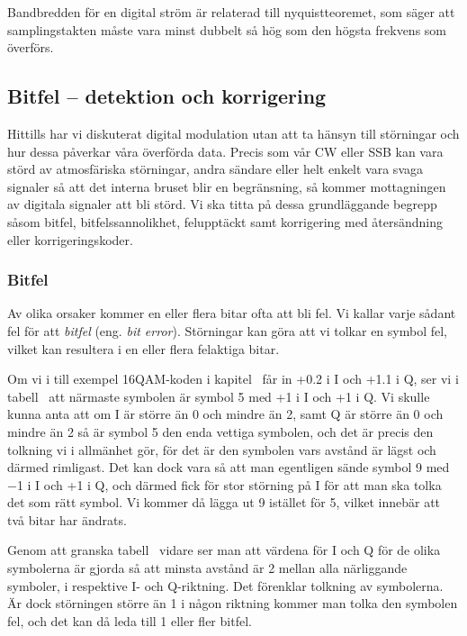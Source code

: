 Bandbredden för en digital ström är relaterad till nyquistteoremet, som säger
att samplingstakten måste vara minst dubbelt så hög som den högsta frekvens
som överförs.

\subsection{Bitfel -- detektion och korrigering}

Hittills har vi diskuterat digital modulation utan att ta hänsyn till
störningar och hur dessa påverkar våra överförda data. Precis som
vår CW eller SSB kan vara störd av atmosfäriska störningar, andra sändare
eller helt enkelt vara svaga signaler så att det interna bruset blir en
begränsning, så kommer mottagningen av digitala signaler att bli störd.
Vi ska titta på dessa grundläggande begrepp såsom bitfel, bitfelssannolikhet,
felupptäckt samt korrigering med återsändning eller korrigeringskoder.

\subsubsection{Bitfel}

Av olika orsaker kommer en eller flera bitar ofta att bli fel.
Vi kallar varje sådant fel för att \emph{bitfel} (eng. \emph{bit error}).
Störningar kan göra att vi tolkar en symbol fel, vilket kan resultera i en eller
flera felaktiga bitar.

Om vi i till exempel 16QAM-koden i kapitel~ får in +0.2 i I och +1.1
i Q, ser vi i tabell~ att närmaste symbolen är symbol 5 med +1
i I och +1 i Q.
Vi skulle kunna anta att om I är större än 0 och mindre än 2, samt Q är större
än 0 och mindre än 2 så är symbol 5 den enda vettiga symbolen, och det är precis
den tolkning vi i allmänhet gör, för det är den symbolen vars avstånd är lägst
och därmed rimligast.
Det kan dock vara så att man egentligen sände symbol 9 med \num{-1} i I och +1 i
Q, och därmed fick för stor störning på I för att man ska tolka det som rätt
symbol.
Vi kommer då lägga ut 9 istället för 5, vilket innebär att två bitar har
ändrats.

Genom att granska tabell~ vidare ser man att värdena för
I och Q för de olika symbolerna är gjorda så att minsta avstånd är 2 mellan
alla närliggande symboler, i respektive I- och Q-riktning.
Det förenklar tolkning av symbolerna.
Är dock störningen större än 1 i någon riktning kommer man tolka den symbolen
fel, och det kan då leda till 1 eller fler bitfel.

